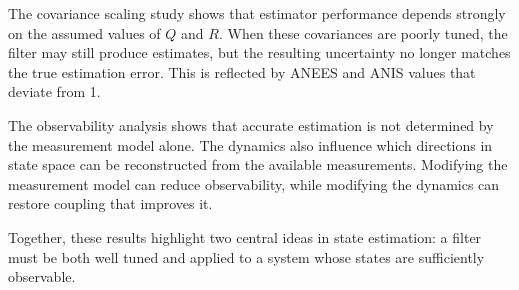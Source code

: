 \documentclass[11pt, letterpaper, twocolumn]{article}
\begin{document}
The covariance scaling study shows that estimator performance depends
strongly on the assumed values of $Q$ and $R$. When these covariances
are poorly tuned, the filter may still produce estimates, but the resulting 
uncertainty no longer matches the true estimation error. This is reflected
by ANEES and ANIS values that deviate from 1.

The observability analysis shows that accurate estimation is not determined
by the measurement model alone. The dynamics also influence which directions
in state space can be reconstructed from the available measurements. 
Modifying the measurement model can reduce observability, while modifying
the dynamics can restore coupling that improves it.

Together, these results highlight two central ideas in state estimation:
a filter must be both well tuned and applied to a system whose states
are sufficiently observable.
\end{document}
